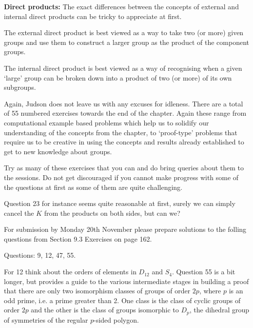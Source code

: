\documentclass[oneside,10pt]{amsart}
\begin{document}
\textbf{Direct products:}
The exact differences between the concepts of external and internal direct products can be tricky to appreciate at first.

The external direct product is best viewed as a way to take two (or more) given groups and use them to construct a larger group as the product of the component groups.

The internal direct product is best viewed as a way of recognising when a given `large' group can be broken down into a product of two (or more) of its own subgroups.

Again, Judson does not leave us with any excuses for idleness. There are a total of 55 numbered exercises towards the end of the chapter. Again these range from computational example based problems which help us to solidify our understanding of the concepts from the chapter, to `proof-type' problems that require us to be creative in using the concepts and results already established to get to new knowledge about groups.

Try as many of these exercises that you can and do bring queries about them to the sessions. Do not get discouraged if you cannot make progress with some of the questions at first as some of them are quite challenging.

Question 23 for instance seems quite reasonable at first, surely we can simply cancel the $K$ from the products on both sides, but can we?

For submission by Monday 20th November please prepare solutions to the folling questions from Section 9.3 Exercises on page 162.

Questions: 9, 12, 47, 55.

For 12 think about the orders of elements in $D_{12}$ and $S_4$. Question 55 is a bit longer, but provides a guide to the various intermediate stages in building a proof that there are only two isomorphism classes of groups of order $2p$, where $p$ is an odd prime, i.e. a prime greater than 2. One class is the class of cyclic groups of order $2p$ and the other is the class of groups isomorphic to $D_{p}$, the dihedral group of symmetries of the regular $p$-sided polygon. 
\end{document}

